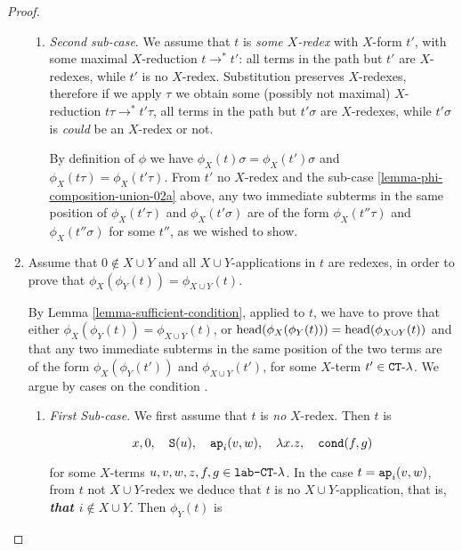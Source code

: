 \begin{proof}
\begin{enumerate}
\begin{enumerate}
\item
\emph{Second sub-case}.
We assume that $t$ is \emph{some $X$-redex} with $X$-form $t'$, with some maximal $X$-reduction
$t \rightarrow^* t'$: all terms in the path but $t'$ are $X$-redexes, while $t'$ is no $X$-redex. 
Substitution preserves $X$-redexes, therefore if we apply $\tau$ we obtain some  
(possibly not maximal) $X$-reduction $t\tau \rightarrow^* t'\tau$, 
all terms in the path but $t'\sigma$ are $X$-redexes, while 
$t'\sigma$ is \emph{could} be an $X$-redex or not.

By definition of $\phi$ we have $\phi_X(t)\sigma = \phi_X(t')\sigma$ 
and $\phi_X(t\tau) = \phi_X(t'\tau)$.
From $t'$ no $X$-redex and the sub-case \ref{lemma-phi-composition-union-02a} above, 
any two immediate subterms in the same position of $\phi_X(t'\tau)$ and $\phi_X(t'\sigma)$
are of the form $\phi_X(t''\tau)$ and $\phi_X(t''\sigma)$ for some $t''$,
as we wished to show.

\end{enumerate}


\item
Assume that $0 \not \in X \cup Y$ and all $X \cup Y$-applications in $t$ are redexes, 
in order to prove that $\phi_{X}(\phi_{Y}(t)) = \phi_{X \cup Y}(t)$.

By Lemma \ref{lemma-sufficient-condition}, applied to $t$, we have to prove that
either $\phi_{X}(\phi_{Y}(t)) = \phi_{X \cup Y}(t)$, or
${\rm head}( \phi_{X}(\phi_{Y}(t)) ) = {\rm head}( \phi_{X \cup Y}(t) )$ 
and that any two immediate subterms in the same position of the two terms 
are of the form $\phi_{X}(\phi_{Y}(t')) $ and $\phi_{X \cup Y}(t')$, 
for some $X$-term $t' \in { {\tt CT}\mbox{-}\lambda}$.
We argue by cases on the condition \emph{}.

\begin{enumerate}
\item
\emph{First Sub-case}.
We first assume that $t$ is \emph{no} $X$-redex. Then $t$ is

$$ 
x, 
0, \ \ \  
{\tt S}(u),  \ \ \  
{\tt ap}_i(v,w), \ \ \  
\lambda x.z, \ \ \  
{\tt cond}(f,g)
$$

for some $X$-terms $u,v,w,z,f,g \in {\mbox{\tt lab-} { {\tt CT}\mbox{-}\lambda} }$. 
In the case $t = {\tt ap}_i(v,w)$, from $t$ not $X \cup Y$-redex we deduce that $t$ is no
$X \cup Y$-application, that is, \emph{\bf that $i \not \in X \cup Y$}. 
Then $\phi_{Y}(t)$ is


\end{enumerate}
\end{enumerate}
\end{proof}
